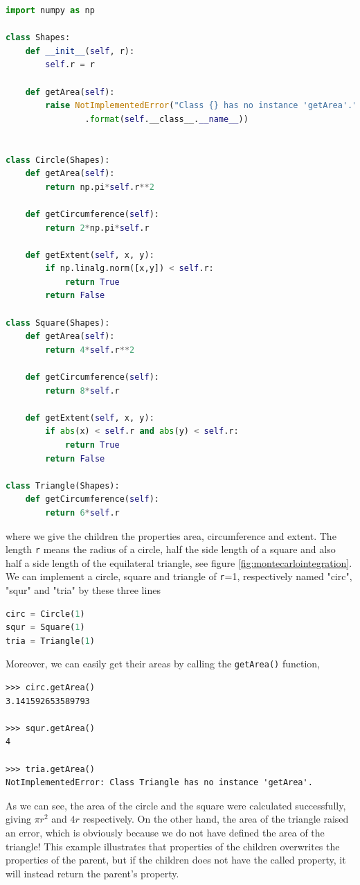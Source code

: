 \lstset{basicstyle=\scriptsize}
\begin{lstlisting}[language=python]
import numpy as np

class Shapes:
	def __init__(self, r):
		self.r = r

	def getArea(self):
		raise NotImplementedError("Class {} has no instance 'getArea'."
				.format(self.__class__.__name__))


class Circle(Shapes):
	def getArea(self):
		return np.pi*self.r**2

	def getCircumference(self):
		return 2*np.pi*self.r

	def getExtent(self, x, y):
		if np.linalg.norm([x,y]) < self.r:
			return True
		return False

class Square(Shapes):
	def getArea(self):
		return 4*self.r**2

	def getCircumference(self):
		return 8*self.r

	def getExtent(self, x, y):
		if abs(x) < self.r and abs(y) < self.r:
			return True
		return False

class Triangle(Shapes):
	def getCircumference(self):
		return 6*self.r
\end{lstlisting}
where we give the children the properties area, circumference and extent. The length \texttt{r} means the radius of a circle, half the side length of a square and also half a side length of the equilateral triangle, see figure \eqref{fig:montecarlointegration}. We can implement a circle, square and triangle of \texttt{r}=1, respectively named "circ", "squr" and "tria" by these three lines
\lstset{basicstyle=\scriptsize}
\begin{lstlisting}[language=python]
circ = Circle(1)
squr = Square(1)
tria = Triangle(1)
\end{lstlisting}
Moreover, we can easily get their areas by calling the \texttt{getArea()} function,
\lstset{basicstyle=\scriptsize}
\begin{lstlisting}
>>> circ.getArea()
3.141592653589793

>>> squr.getArea()
4

>>> tria.getArea()
NotImplementedError: Class Triangle has no instance 'getArea'.
\end{lstlisting}

As we can see, the area of the circle and the square were calculated successfully, giving $\pi r^2$ and $4r$ respectively. On the other hand, the area of the triangle raised an error, which is obviously because we do not have defined the area of the triangle! This example illustrates that properties of the children overwrites the properties of the parent, but if the children does not have the called property, it will instead return the parent's property. 

